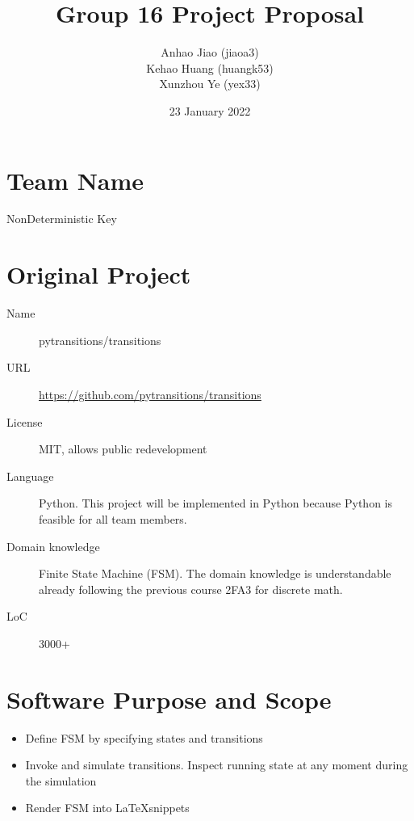 \documentclass[12pt]{article}
\title{Group 16 Project Proposal}
\author{Anhao Jiao (jiaoa3) \\ Kehao Huang (huangk53) \\ Xunzhou Ye (yex33)}
\date{23 January 2022}
\begin{document}
\maketitle{}

\section{Team Name}

NonDeterministic Key

\section{Original Project}

\begin{description}
\item[Name] pytransitions/transitions
\item[URL] \url{https://github.com/pytransitions/transitions}  
\item[License] MIT, allows public redevelopment
\item[Language] Python. This project will be implemented in Python because
  Python is feasible for all team members.
\item[Domain knowledge] Finite State Machine (FSM). The domain knowledge is
  understandable already following the previous course 2FA3 for discrete math.
\item[LoC] 3000+
\end{description}

\section{Software Purpose and Scope}

\begin{itemize}
\item Define FSM by specifying states and transitions
\item Invoke and simulate transitions. Inspect running state at any moment
  during the simulation
\item Render FSM into \LaTeX snippets
\end{itemize}
\end{document}
